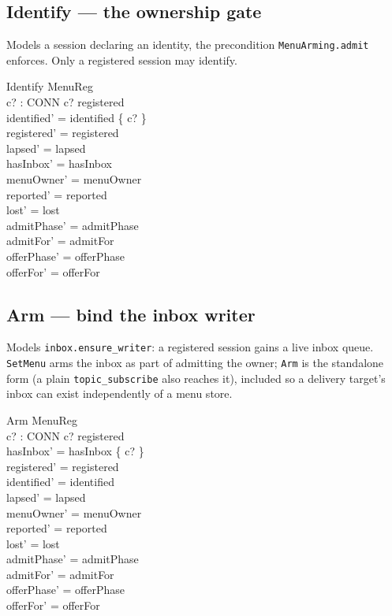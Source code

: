 \documentclass[a4paper,10pt,fleqn]{article}
\begin{document}
\subsection{Identify --- the ownership gate}

Models a session declaring an identity, the precondition
\texttt{MenuArming.admit} enforces. Only a registered session may identify.

\begin{schema}{Identify}
  \Delta MenuReg \\
  c? : CONN
\where
  c? \in registered \\
  identified' = identified \cup \{ c? \} \\
  registered' = registered \\
  lapsed' = lapsed \\
  hasInbox' = hasInbox \\
  menuOwner' = menuOwner \\
  reported' = reported \\
  lost' = lost \\
  admitPhase' = admitPhase \\
  admitFor' = admitFor \\
  offerPhase' = offerPhase \\
  offerFor' = offerFor
\end{schema}

\subsection{Arm --- bind the inbox writer}

Models \texttt{inbox.ensure\_writer}: a registered session gains a live
inbox queue. \texttt{SetMenu} arms the inbox as part of admitting the owner;
\texttt{Arm} is the standalone form (a plain \texttt{topic\_subscribe} also
reaches it), included so a delivery target's inbox can exist independently of
a menu store.

\begin{schema}{Arm}
  \Delta MenuReg \\
  c? : CONN
\where
  c? \in registered \\
  hasInbox' = hasInbox \cup \{ c? \} \\
  registered' = registered \\
  identified' = identified \\
  lapsed' = lapsed \\
  menuOwner' = menuOwner \\
  reported' = reported \\
  lost' = lost \\
  admitPhase' = admitPhase \\
  admitFor' = admitFor \\
  offerPhase' = offerPhase \\
  offerFor' = offerFor
\end{schema}
\end{document}
